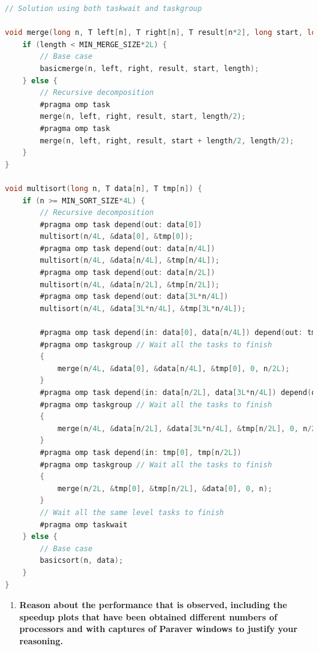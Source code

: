 \documentclass[a4paper]{article}
\newenvironment{questionenum}{%
\setlist[enumerate]{resume}
\restartlist{enumerate}
\newcommand{\question}[1]{
\begin{enumerate}
	\item\bfseries ##1
\end{enumerate}
}}{%
}
\begin{document}
\begin{questionenum}
\begin{lstlisting}[language=C, title=\texttt{multisort-omp-tree-dep-taskwait.c}]
    \end{lstlisting}
    
    \begin{lstlisting}[language=C, title=\texttt{multisort-omp-tree-dep-taskgroup.c}]
// Solution using both taskwait and taskgroup
    
void merge(long n, T left[n], T right[n], T result[n*2], long start, long length) {
    if (length < MIN_MERGE_SIZE*2L) {
        // Base case
        basicmerge(n, left, right, result, start, length);
    } else {
        // Recursive decomposition
        #pragma omp task
        merge(n, left, right, result, start, length/2);
        #pragma omp task
        merge(n, left, right, result, start + length/2, length/2);
    }
}

void multisort(long n, T data[n], T tmp[n]) {
    if (n >= MIN_SORT_SIZE*4L) {
        // Recursive decomposition
        #pragma omp task depend(out: data[0])
        multisort(n/4L, &data[0], &tmp[0]);
        #pragma omp task depend(out: data[n/4L])
        multisort(n/4L, &data[n/4L], &tmp[n/4L]);
        #pragma omp task depend(out: data[n/2L])
        multisort(n/4L, &data[n/2L], &tmp[n/2L]);
        #pragma omp task depend(out: data[3L*n/4L])
        multisort(n/4L, &data[3L*n/4L], &tmp[3L*n/4L]);
        
        #pragma omp task depend(in: data[0], data[n/4L]) depend(out: tmp[0])
        #pragma omp taskgroup // Wait all the tasks to finish
        {
            merge(n/4L, &data[0], &data[n/4L], &tmp[0], 0, n/2L);
        }
        #pragma omp task depend(in: data[n/2L], data[3L*n/4L]) depend(out: tmp[n/2L])
        #pragma omp taskgroup // Wait all the tasks to finish
        {
            merge(n/4L, &data[n/2L], &data[3L*n/4L], &tmp[n/2L], 0, n/2L);
        }
        #pragma omp task depend(in: tmp[0], tmp[n/2L])
        #pragma omp taskgroup // Wait all the tasks to finish
        {
            merge(n/2L, &tmp[0], &tmp[n/2L], &data[0], 0, n);
        }
        // Wait all the same level tasks to finish
        #pragma omp taskwait
    } else {
        // Base case
        basicsort(n, data);
    }
}
    \end{lstlisting}
	
	\question{Reason about the performance that is observed, including the speedup plots that have been obtained different numbers of processors and with captures of Paraver windows to justify your reasoning.}
    

\end{questionenum}
\end{document}
